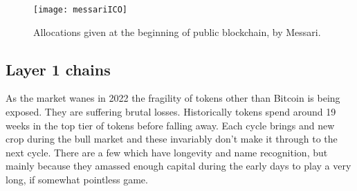\begin{figure}
  \centering
    \texttt{[image: messariICO]}
  \caption{Allocations given at the beginning of public blockchain, by Messari.}
  \label{fig:messariICO}
\end{figure}

\subsection{Layer 1 chains}
As the market wanes in 2022 the fragility of tokens other than Bitcoin is being exposed. They are suffering brutal losses. Historically tokens spend around 19 weeks in the top tier of tokens before falling away. Each cycle brings and new crop during the bull market and these invariably don't make it through to the next cycle. There are a few which have longevity and name recognition, but mainly because they amassed enough capital during the early days to play a very long, if somewhat pointless game.
